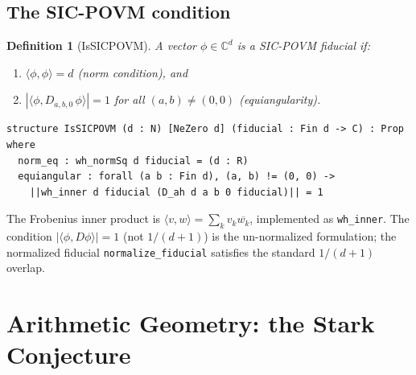 \documentclass[12pt,a4paper]{article}
\newtheorem{definition}[theorem]{Definition}
\begin{document}
\subsection{The SIC-POVM condition}
\begin{definition}[IsSICPOVM]
A vector $\phi \in \mathbb{C}^d$ is a \emph{SIC-POVM fiducial} if:
\begin{enumerate}[label=(\roman*)]
  \item $\langle \phi, \phi \rangle = d$ \quad (norm condition), and
  \item $|\langle \phi, D_{a,b,0}\,\phi \rangle| = 1$ for all $(a,b) \neq (0,0)$ \quad (equiangularity).
\end{enumerate}
\end{definition}
\begin{lstlisting}
structure IsSICPOVM (d : N) [NeZero d] (fiducial : Fin d -> C) : Prop where
  norm_eq : wh_normSq d fiducial = (d : R)
  equiangular : forall (a b : Fin d), (a, b) != (0, 0) ->
    ||wh_inner d fiducial (D_ah d a b 0 fiducial)|| = 1
\end{lstlisting}
The Frobenius inner product is $\langle v, w \rangle = \sum_k v_k \overline{w_k}$,
implemented as \texttt{wh\_inner}. The condition $|\langle\phi, D\phi\rangle|=1$
(not $1/(d+1)$) is the un-normalized formulation; the normalized fiducial
\texttt{normalize\_fiducial} satisfies the standard $1/(d+1)$ overlap.
\section{Arithmetic Geometry: the Stark Conjecture}
\label{sec:stark}
\end{document}
